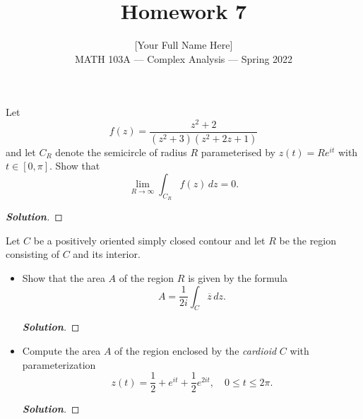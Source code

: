 \documentclass[11pt]{article}
\newenvironment{problem}[2][Problem\!]{\begin{trivlist}
\item[\hskip \labelsep {\bfseries #1}\hskip \labelsep {\bfseries #2.}]}{\end{trivlist}}
\newenvironment{solution}{\begin{proof}[\textbf{\textit{Solution}}]}{\end{proof}}
\renewcommand{\leq}{\leqslant}
\begin{document}
 
\title{Homework 7}
\author{[Your Full Name Here]\\[0.5em]
MATH 103A --- Complex Analysis --- Spring 2022}
\date{} 
\maketitle


\begin{problem}{7.1}
Let 
\[f(z) = \frac{z^2+2}{(z^2+3)(z^2 + 2z + 1)}\]
and let $C_R$ denote the semicircle of radius $R$ parameterised by $z(t) = Re^{it}$ with $t \in [0,\pi]$. Show that
\[\lim_{R\to \infty} \int_{C_R}f(z) \, dz = 0.\]
\end{problem}
\begin{solution}
\end{solution}

\newpage  %

\begin{problem}{7.2}
Let $C$ be a positively oriented simply closed contour and let $R$ be the region consisting of $C$ and its interior.
\begin{itemize}[itemsep=3em]
\item[(a)] Show that the area $A$ of the region $R$ is given by the formula \[A = \frac{1}{2i} \int_C \overline{z} \, dz.\]
\begin{solution}
\end{solution}

\item[(b)] Compute the area $A$ of the region enclosed by the \emph{cardioid} $C$ with parameterization
\[z(t) = \frac{1}{2} + e^{it} + \frac{1}{2}e^{2it},\quad 0 \leq t \leq 2\pi.\] 
\begin{solution}
\end{solution}

\end{itemize}
\end{problem}

\newpage  %
\end{document}
